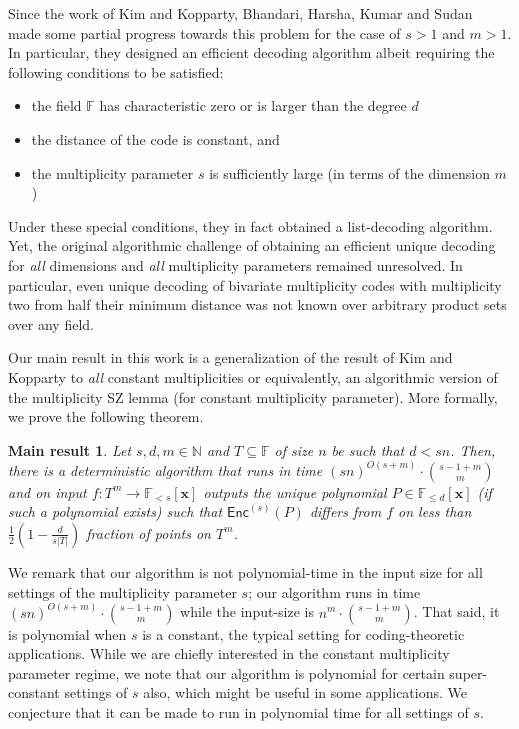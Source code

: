 \documentclass{theoretics}
\def\Natural{\mathbb{N}}
\def\Field{\mathbb{F}}
\let\N\Natural
\let\F\Field
\def\vecx{\mathbf{x}}
\newtheorem*{mainthm}{Main result}
\newcommand{\enc}{{\mathsf{Enc}}}
\newcommand{\vx}{\vecx}
\begin{document}
	Since the work of Kim and Kopparty, Bhandari, Harsha, Kumar and Sudan~\cite{BhandariHKS2021-mgrid} made some
	partial progress towards this problem for the case of $s>1$ and
	$m >1$. In particular, they designed an efficient decoding algorithm
	albeit requiring the following conditions to be satisfied: 
	\begin{itemize}
		\item  the field $\F$ has characteristic zero or is larger than the degree $d$
		\item the distance of the code is constant, and
		\item the multiplicity parameter $s$ is sufficiently large (in terms of the dimension $m$)
	\end{itemize}
	Under these special conditions, they in
	fact obtained a list-decoding algorithm. Yet, the original algorithmic
	challenge of obtaining an efficient unique decoding for \emph{all}
	dimensions and \emph{all} multiplicity parameters remained
	unresolved. In particular, even unique
	decoding of bivariate multiplicity codes with multiplicity two from
	half their minimum distance was not known over arbitrary product
	sets over any field.
	
	Our main result in this work is a generalization of the result of Kim
	and Kopparty  to \emph{all} constant multiplicities or equivalently, an algorithmic version of the multiplicity SZ lemma (for constant multiplicity parameter). More formally, we prove the following theorem. 
	
	\begin{mainthm}\label{thm: main intro}
		Let $s, d, m \in \N$ and $T \subseteq \F$ of size $n$ be such that $d <
		sn$. Then, there is a deterministic algorithm that runs in time
		$(sn)^{O(s+m)}\cdot  \binom{s - 1 + m}{m}$ and on
		input $f\colon T^m \to \mathbb{F}_{<s}[\vx]$ outputs the unique polynomial
		$P \in \mathbb{F}_{\leq d}[\vx]$ (if such  a polynomial exists) such that $\enc^{(s)}(P)$
		differs from $f$ on less than $\frac12\left(1-\frac{d}{s|T|}\right)$ fraction of points on $T^m$.   
	\end{mainthm}
	
	We remark that our algorithm is not polynomial-time in the input size for all settings of the multiplicity parameter $s$; our algorithm runs in time $(sn)^{O(s+m)}\cdot  \binom{s - 1 + m}{m}$ while the input-size is $n^{m}\cdot  \binom{s - 1 + m}{m}$. That said, it is polynomial when $s$ is a constant, the typical setting for coding-theoretic applications. While we are chiefly interested in the constant multiplicity parameter regime, we note that our algorithm is polynomial for certain super-constant settings of $s$ also, which might be useful in some applications. We conjecture that it can be made to run in polynomial time for all settings of $s$. 
	
\end{document}
